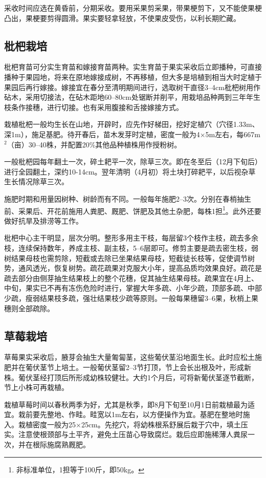 \documentclass{ctexbook}
\begin{document}
采收时间应选在黄昏前，分期采收。要用采果剪采果，带果梗剪下，又不能使果梗凸出，果梗要剪得圆滑。果实要轻拿轻放，不使果皮受伤，以利长期贮藏。
\subsection{枇杷栽培}
枇杷育苗可分实生育苗和嫁接育苗两种。实生育苗于果实采收后立即播种，可直接播种于果园地，将来在原地嫁接成树，不再移植，但大多是培植到相当大时定植于果园后再行嫁接。嫁接宜在春分至清明期间进行，选取树干直径3--4cm枇杷树用作砧木，采用切接法，在砧木距地60--80cm处锯断并削平，用栽培品种两到三年年生枝条作接穗，进行切接。也有采用腹接和舌接嫁接方式。

栽植枇杷一般均生长在山地，开辟时，应先作好梯田，挖好定植穴（穴径1.33m、深1m），施足基肥。待开春后，苗木发芽时定植，密度一般为4$\times$5m左右，每667m$^2$（亩）30--40株，并配置20\%其他品种植株用作授粉树。

一般枇杷园每年翻土一次，碎土耙平一次，除草三次。即在冬至后（12月下旬后）进行全园翻土，深约10-14cm。翌年清明（4月初）将土块打碎耙平，以后视杂草生长情况除草三次。

施肥时期和用量因树种、树龄而有不同。一般每年施肥2--3次。分别在春梢抽生前、采果后、开花前施用人粪肥、厩肥、饼肥及其他土杂肥，每株1担\footnote{非标准单位，1担等于100斤，即50kg。}。此外还要做好抗旱及排涝等工作。

枇杷中心主干明显，层次分明。整形多用主干枝，每层留3个枝作主枝，疏去多余枝，连续保持数年，养成主枝、副主枝，5--6层即可。修剪主要是疏去密生枝，弱树结果母枝也需剪除，短截或去除已坐果结果母枝，短截徒长枝等，促使调节树势，通风透光，恢复树势。疏花疏果对克服大小年，提高品质均效果良好。疏花是疏去部分由侧芽抽生结果枝上的整个花穗，促其抽生结果母枝。疏果宜在4月上、中旬，果实已不再有冻伤危险时进行，掌握大年多疏、小年少疏，顶部多疏、中部少疏，瘦弱结果枝多疏，强壮结果枝少疏等原则。一般每果穗留3--6果，秋梢上果穗则全部疏除。
\subsection{草莓栽培}
草莓果实采收后，腋芽会抽生大量匍匐茎，这些葡伏茎沿地面生长。此时应松土施肥并在葡伏茎节上培土。一般葡伏茎留2--3节打顶，节上会长出根及叶，形成新株。葡伏茎经打顶后所形成幼株较健壮。大约1个月后，可将新葡伏茎逐节截断，节上小株可再栽植。

栽植草莓时间以春秋两季为好，尤其是秋季，即8月下旬至10月1日前栽植最为适宜。栽前要先整地、作畦。畦宽以1m左右，以方便操作为宜。基肥在整地时施入。栽植密度一般为25$\times$25cm。先挖穴，将幼株根系舒展后栽于穴中，填土压实。注意使根颈部与土平齐，避免土压苗心导致腐烂。栽后应即施稀薄人粪尿一次，并在根际施腐熟厩肥。
\end{document}
